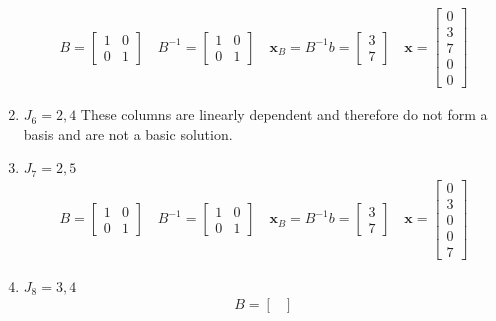 \documentclass[11pt]{article}
\begin{document}
\begin{enumerate}
\begin{align*}
        B = 
        \begin{bmatrix}
          1 & 0 \\ 0 & 1
        \end{bmatrix}
        \quad
        B^{-1} =
        \begin{bmatrix}
          1 & 0 \\ 0 & 1
        \end{bmatrix}
        \quad 
        \textbf{x}_{B} = B^{-1} b = 
        \begin{bmatrix}
          3 \\ 7
        \end{bmatrix}
        \quad
        \textbf{x} =
        \begin{bmatrix}
          0 \\ 3 \\ 7 \\ 0 \\ 0
        \end{bmatrix}
      \end{align*}
    \item $J_{6} = 2,4$
    These columns are linearly dependent and therefore do not form a basis and are not a basic solution.
    \item $J_{7} = 2,5$
    \begin{align*}
        B = 
        \begin{bmatrix}
          1 & 0 \\ 0 & 1
        \end{bmatrix}
        \quad
        B^{-1} =
        \begin{bmatrix}
          1 & 0 \\ 0 & 1
        \end{bmatrix}
        \quad 
        \textbf{x}_{B} = B^{-1} b = 
        \begin{bmatrix}
          3 \\ 7
        \end{bmatrix}
        \quad
        \textbf{x} =
        \begin{bmatrix}
          0 \\ 3 \\ 0 \\ 0 \\ 7
        \end{bmatrix}
      \end{align*}
    \item $J_{8} = 3,4$
    \begin{align*}
        B = 
        \begin{bmatrix}

\end{bmatrix}
\end{align*}
\end{enumerate}
\end{document}
